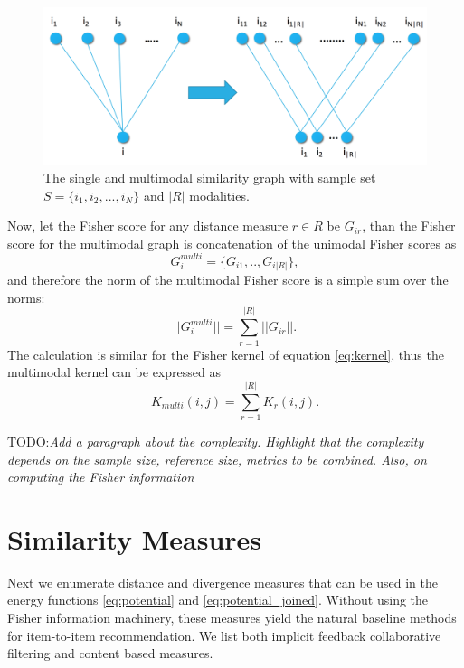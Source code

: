 \begin{figure}
\centerline{
\includegraphics[scale=.2]{i2i_multi.png}}
\caption{The single and multimodal similarity graph with sample set $S=\{i_1,i_2,...,i_{N}\}$ and $|R|$ modalities.}
\label{fig:multi}
\end{figure}



Now, let the Fisher score for any distance measure $r \in R$ be $G_{ir}$, than the Fisher score for the multimodal graph is concatenation of the unimodal Fisher scores as
%
\begin{equation}
G_i^{multi} = \{G_{i1},..,G_{i|R|}\},
\nonumber
\end{equation}
%
and therefore the norm of the multimodal Fisher score is a simple sum over the norms: 
%
\begin{equation}
|| G_i^{multi}|| = \sum_{r=1}^{|R|} ||G_{ir}||.
\label{eq:fs_multi}
\end{equation}
%
The calculation is similar for the Fisher kernel of equation \eqref{eq:kernel}, thus the multimodal kernel can be expressed as
%
\begin{equation}
K_{multi}(i,j) = \sum_{r=1}^{|R|} K_r(i,j).
\label{eq:fk_multi}
\end{equation}


TODO:\textit{Add a paragraph about the complexity. Highlight that the complexity depends on the sample size, reference size, metrics to be combined. Also, on computing the Fisher information}

\section{Similarity Measures}

Next we enumerate distance and divergence measures that can be used in the energy functions \eqref{eq:potential} and \eqref{eq:potential_joined}. 
Without using the Fisher information machinery, these measures yield the natural baseline methods for item-to-item recommendation.
We list both implicit feedback collaborative filtering and content based measures.

